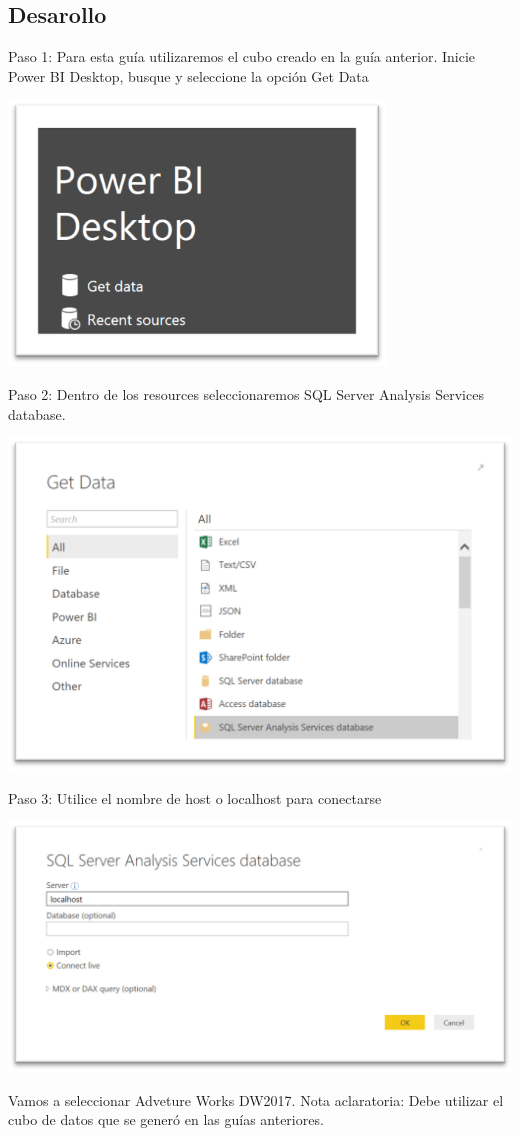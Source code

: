 \documentclass[12pt,letterpaper]{article}
\begin{document}
\subsection*{Desarollo}
Paso 1: Para esta guía utilizaremos el cubo creado en la guía anterior. Inicie Power BI Desktop, busque y seleccione la opción Get Data
\begin{center}
    \includegraphics[width=10cm]{img/1.png}  
\end{center}
Paso 2: Dentro de los resources seleccionaremos SQL Server Analysis Services database.
\begin{center}
    \includegraphics[width=16cm]{img/2.png}  
\end{center}
Paso 3: Utilice el nombre de host o localhost para conectarse
\begin{center}
    \includegraphics[width=16cm]{img/3.png}  
\end{center}
Vamos a seleccionar Adveture Works DW2017.
Nota aclaratoria: Debe utilizar el cubo de datos que se generó en las guías anteriores.
\end{document}
